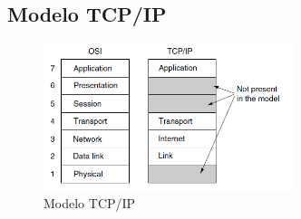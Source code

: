 \documentclass[10pt,a4paper]{article}
\begin{document}
\subsection{Modelo TCP/IP}
\begin{figure}[H]
	\centering
	\includegraphics[width=0.65\textwidth
]{images/tcpip.png}
	\caption[Modelo TCP/IP de Referencia]{Modelo TCP/IP}
	\label{fig:tcp}
\end{figure}
\end{document}
